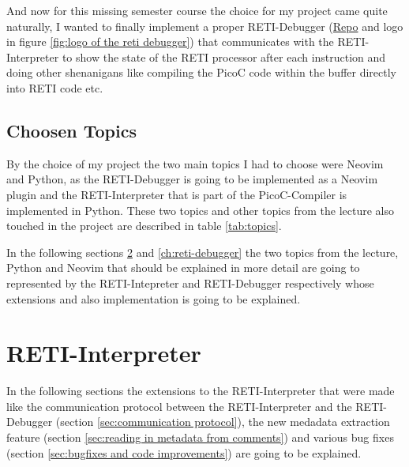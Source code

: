 \documentclass{report}
\begin{document}
And now for this missing semester course the choice for my project came quite naturally, I wanted to finally implement a proper \alert{RETI-Debugger} (\href{https://github.com/freiburg-missing-semester-course/project-matthejue}{Repo} and logo in figure \ref{fig:logo of the reti debugger}) that communicates with the RETI-Interpreter to show the state of the RETI processor after each instruction and doing other shenanigans like compiling the PicoC code within the buffer directly into RETI code etc.

\section{Choosen Topics}
\label{sec:choosen_topics}

By the choice of my project the two main topics I had to choose were \alert{Neovim} and \alert{Python}, as the \alert{RETI-Debugger} is going to be implemented as a Neovim plugin and the \alert{RETI-Interpreter} that is part of the PicoC-Compiler is implemented in Python. These two topics and other topics from the lecture also touched in the project are described in table \ref{tab:topics}.

In the following sections \ref{ch:reti-interpreter} and \ref{ch:reti-debugger} the two topics from the lecture, Python and Neovim that should be explained in more detail are going to represented by the RETI-Intepreter and RETI-Debugger respectively whose extensions and also implementation is going to be explained.



\vspace{0.5cm}
\chapter{RETI-Interpreter}
\label{ch:reti-interpreter}

In the following sections the extensions to the RETI-Interpreter that were made like the communication protocol between the RETI-Interpreter and the RETI-Debugger (section \ref{sec:communication protocol}), the new medadata extraction feature (section \ref{sec:reading in metadata from comments}) and various bug fixes (section \ref{sec:bugfixes and code improvements}) are going to be explained.
\end{document}
